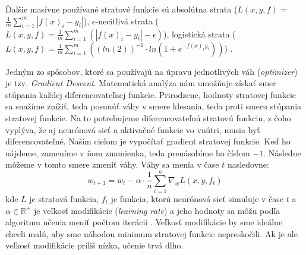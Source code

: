 Ďalšie masívne používané stratové funkcie sú 
absolútna strata ($L(x,y,f) = $ $\frac{1}{m}\sum_{i=1}^m \left|f(x)_i - y_i\right|$), 
$\epsilon$-necitlivá strata ($L(x,y,f) = \frac{1}{m}\sum_{i=1}^m \left(\left|f(x)_i - y_i\right| - \epsilon\right)$), 
logistická strata ($L(x,y,f) = \frac{1}{m} \sum_{i=1}^m  \left((ln(2))^{-1}\cdot ln(1+e^{-f(x)_iy_i})\right) $)
\citep{loss}.

Jedným zo spôsobov, ktoré sa používajú na úpravu jednotlivých váh (\textit{optimizer}) je tzv. \textit{Gradient Descent}.
Matematická analýza nám umožňuje získať smer stúpania každej diferencovateľnej funkcie.
Prirodzene, hodnoty stratovej funkcie sa snažíme znížiť, teda posunúť váhy v smere klesania, teda proti smeru stúpania stratovej funkcie.
Na to potrebujeme diferencovateľnú stratovú funkciu, z čoho vyplýva, že aj neurónová sieť a aktivačné funkcie vo vnútri, musia byť diferencovateľné.
Naším cieľom je vypočítať gradient stratovej funkcie.
Keď ho nájdeme, zameníme v ňom znamienka, teda prenásobíme ho číslom $-1$.
Následne môžeme v tomto smere zmeniť váhy.
Váhy sa menia v čase $t$ nasledovne: 
$$w_{t+1} = w_t - \alpha \cdot \frac{1}{n} \sum_{i=1}^n \nabla_w L(x,y,f_t)$$
kde $L$ je stratová funkcia, $f_t$ je funkcia, ktorú neurónová sieť simuluje v čase $t$  a $\alpha \in \mathbb{R}^+$ je veľkosť modifikácie (\textit{learning rate}) a jeho hodnoty sa môžu podľa algoritmu učenia meniť počtom iterácií \citep{nn:gd}. Veľkosť modifikácie by sme ideálne chceli malú, aby sme náhodou minimum stratovej funkcie nepreskočili. Ak je ale veľkosť modifikácie príliš nízka, učenie trvá dlho.

